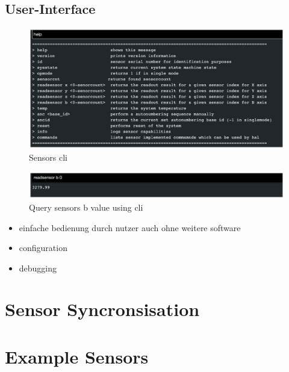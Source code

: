 \hypertarget{user-interface}{%
\subsection{User-Interface}\label{user-interface}}

\begin{figure}
\centering
\includegraphics{./generated_images/border_Sensors_(+cli).png}
\caption{Sensors \gls{cli} \label{Sensors_(+cli).png}}
\end{figure}

\begin{figure}
\centering
\includegraphics{./generated_images/border_Query_sensors_b_value_using_(+cli).png}
\caption{Query sensors b value using \gls{cli}
\label{Query_sensors_b_value_using_(+cli).png}}
\end{figure}

\begin{itemize}
\tightlist
\item
  einfache bedienung durch nutzer auch ohne weitere software
\item
  configuration
\item
  debugging
\end{itemize}

\hypertarget{sensor-syncronsisation}{%
\section{Sensor Syncronsisation}\label{sensor-syncronsisation}}

\hypertarget{example-sensors}{%
\section{Example Sensors}\label{example-sensors}}

